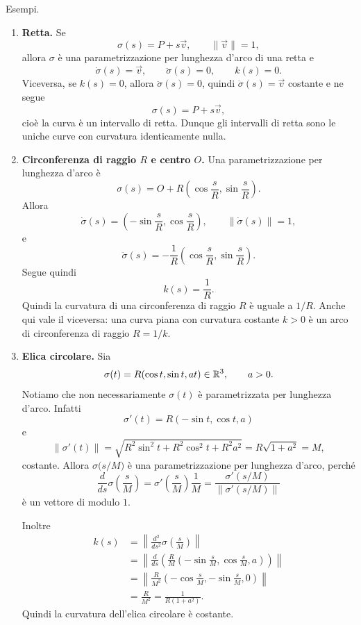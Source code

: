 \documentclass[a4paper]{article}
\begin{document}
\begin{snippetexample}{}
Esempi.
\begin{enumerate}
    \item \textbf{Retta.} Se
    \[
         \sigma(s)=P+s\vec v,
         \qquad
         \|\vec v\|=1,
    \]
    allora \(\sigma\) è una parametrizzazione per lunghezza d'arco di una retta e
    \[
         \dot\sigma(s)=\vec v,
         \qquad
         \ddot\sigma(s)=0,
         \qquad
         k(s)=0.
    \]
    Viceversa, se \(k(s)=0\), allora \(\ddot\sigma(s)=0\), quindi \(\dot\sigma(s)=\vec v\) costante e ne segue
    \[
         \sigma(s)=P+s\vec v,
    \]
    cioè la curva è un intervallo di retta. Dunque gli intervalli di retta sono le uniche curve con curvatura identicamente nulla.

    \item \textbf{Circonferenza di raggio \(R\) e centro \(O\).} Una parametrizzazione per lunghezza d'arco è
    \[
         \sigma(s)=O+R\left(\cos\frac{s}{R},\sin\frac{s}{R}\right).
    \]
    Allora
    \[
         \dot\sigma(s)=\left(-\sin\frac{s}{R},\cos\frac{s}{R}\right),
         \qquad
         \|\dot\sigma(s)\|=1,
    \]
    e
    \[
         \ddot\sigma(s)=-\frac{1}{R}\left(\cos\frac{s}{R},\sin\frac{s}{R}\right).
    \]
    Segue quindi
    \[
         k(s)=\frac{1}{R}.
    \]
    Quindi la curvatura di una circonferenza di raggio \(R\) è uguale a \(1/R\). Anche qui vale il viceversa: una curva piana con curvatura costante \(k>0\) è un arco di circonferenza di raggio \(R=1/k\).

    \item \textbf{Elica circolare.} Sia
    \[
         \sigma(t)=R(\cos t,\sin t,at)\in\mathbb{R}^3,
         \qquad a>0.
    \]
    Notiamo che non necessariamente \(\sigma(t)\) è parametrizzata per lunghezza d'arco. Infatti
    \[
         \sigma'(t)=R(-\sin t,\cos t,a)
    \]
    e
    \[
         \|\sigma'(t)\|=\sqrt{R^2\sin^2 t+R^2\cos^2 t+R^2a^2}
         =R\sqrt{1+a^2}
         = M,
    \]
    costante. Allora \(\sigma\bigl(s/M\bigr)\) è una parametrizzazione per lunghezza d'arco, perché
    \[
         \frac{d}{ds}\sigma\left(\frac{s}{M}\right)=\sigma'\left(\frac{s}{M}\right)\frac{1}{M}
         = \frac{\sigma'(s/M)}{\|\sigma'(s/M)\|}
    \]
    è un vettore di modulo \(1\).

    Inoltre
    \begin{align*}
        k(s)
        &= \left\|\frac{d^2}{ds^2}\sigma\left(\frac{s}{M}\right)\right\| \\
        &= \left\|\frac{d}{ds}\left(\frac{R}{M}\left(-\sin\frac{s}{M},\cos\frac{s}{M},a\right)\right)\right\| \\
        &= \left\|\frac{R}{M^2}\left(-\cos\frac{s}{M},-\sin\frac{s}{M},0\right)\right\| \\
        &= \frac{R}{M^2}
        = \frac{1}{R(1+a^2)}.
    \end{align*}
    Quindi la curvatura dell'elica circolare è costante.
\end{enumerate}


\end{snippetexample}
\end{document}
